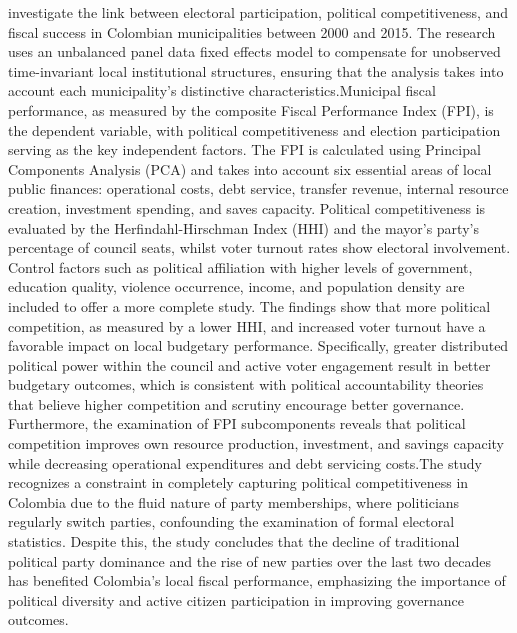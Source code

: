   investigate the link between electoral participation, political competitiveness, and fiscal success in Colombian municipalities between 2000 and 2015. The research uses an unbalanced panel data fixed effects model to compensate for unobserved time-invariant local institutional structures, ensuring that the analysis takes into account each municipality's distinctive characteristics.Municipal fiscal performance, as measured by the composite Fiscal Performance Index (FPI), is the dependent variable, with political competitiveness and election participation serving as the key independent factors. The FPI is calculated using Principal Components Analysis (PCA) and takes into account six essential areas of local public finances: operational costs, debt service, transfer revenue, internal resource creation, investment spending, and saves capacity. Political competitiveness is evaluated by the Herfindahl-Hirschman Index (HHI) and the mayor's party's percentage of council seats, whilst voter turnout rates show electoral involvement. Control factors such as political affiliation with higher levels of government, education quality, violence occurrence, income, and population density are included to offer a more complete study. The findings show that more political competition, as measured by a lower HHI, and increased voter turnout have a favorable impact on local budgetary performance. Specifically, greater distributed political power within the council and active voter engagement result in better budgetary outcomes, which is consistent with political accountability theories that believe higher competition and scrutiny encourage better governance. Furthermore, the examination of FPI subcomponents reveals that political competition improves own resource production, investment, and savings capacity while decreasing operational expenditures and debt servicing costs.The study recognizes a constraint in completely capturing political competitiveness in Colombia due to the fluid nature of party memberships, where politicians regularly switch parties, confounding the examination of formal electoral statistics. Despite this, the study concludes that the decline of traditional political party dominance and the rise of new parties over the last two decades has benefited Colombia's local fiscal performance, emphasizing the importance of political diversity and active citizen participation in improving governance outcomes.\par

